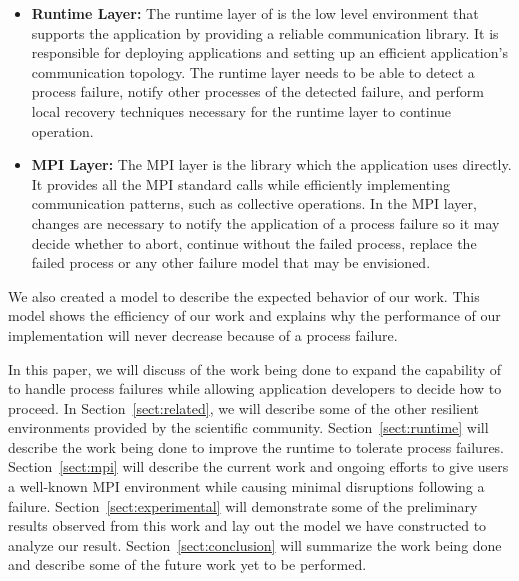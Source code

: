 \begin{itemize}
    \item {\bf Runtime Layer:} The runtime layer of \ompi is the low level
        environment that supports the application by providing a reliable
        communication library. It is responsible for deploying applications and
        setting up an efficient application's communication topology. The
        runtime layer needs to be able to detect a process failure, notify other
        processes of the detected failure, and perform local recovery techniques
        necessary for the runtime layer to continue operation.

    \item {\bf MPI Layer:} The MPI layer is the library which the
        application uses directly. It provides all the MPI standard calls while
        efficiently implementing communication patterns, such as collective
        operations. In the MPI layer, changes are necessary to notify the
        application of a process failure so it may decide whether to abort,
        continue without the failed process, replace the failed process or any
        other failure model that may be envisioned.
\end{itemize}

We also created a model to describe the expected behavior of our work. This
model shows the efficiency of our work and explains why the performance of our
implementation will never decrease because of a process failure.

In this paper, we will discuss of the work being done to expand the capability
of \ompi to handle process failures while allowing application developers to
decide how to proceed. In Section~\ref{sect:related}, we will describe some of
the other resilient environments provided by the scientific community.
Section~\ref{sect:runtime} will describe the work being done to improve the \ompi
runtime to tolerate process failures.  Section~\ref{sect:mpi} will describe the
current work and ongoing efforts to give users a well-known MPI environment
while causing minimal disruptions following a failure.
Section~\ref{sect:experimental} will demonstrate some of the preliminary results
observed from this work and lay out the model we have constructed to analyze our
result. Section~\ref{sect:conclusion} will summarize the work being done and
describe some of the future work yet to be performed.
